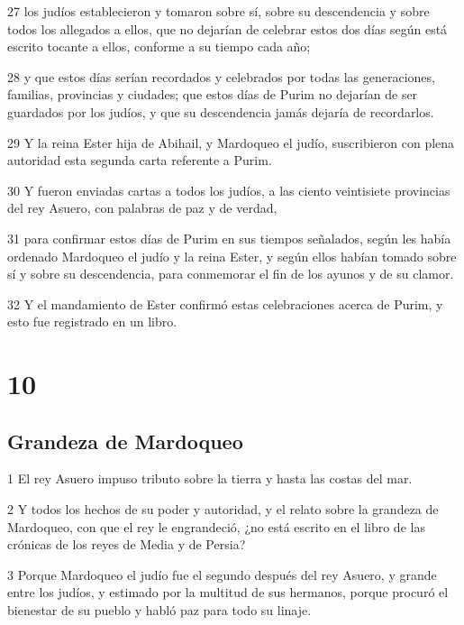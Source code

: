 \par 27 los judíos establecieron y tomaron sobre sí, sobre su descendencia y sobre todos los allegados a ellos, que no dejarían de celebrar estos dos días según está escrito tocante a ellos, conforme a su tiempo cada año;
\par 28 y que estos días serían recordados y celebrados por todas las generaciones, familias, provincias y ciudades; que estos días de Purim no dejarían de ser guardados por los judíos, y que su descendencia jamás dejaría de recordarlos.
\par 29 Y la reina Ester hija de Abihail, y Mardoqueo el judío, suscribieron con plena autoridad esta segunda carta referente a Purim.
\par 30 Y fueron enviadas cartas a todos los judíos, a las ciento veintisiete provincias del rey Asuero, con palabras de paz y de verdad,
\par 31 para confirmar estos días de Purim en sus tiempos señalados, según les había ordenado Mardoqueo el judío y la reina Ester, y según ellos habían tomado sobre sí y sobre su descendencia, para conmemorar el fin de los ayunos y de su clamor.
\par 32 Y el mandamiento de Ester confirmó estas celebraciones acerca de Purim, y esto fue registrado en un libro.

\chapter{10}

\section*{Grandeza de Mardoqueo}

\par 1 El rey Asuero impuso tributo sobre la tierra y hasta las costas del mar.
\par 2 Y todos los hechos de su poder y autoridad, y el relato sobre la grandeza de Mardoqueo, con que el rey le engrandeció, ¿no está escrito en el libro de las crónicas de los reyes de Media y de Persia?
\par 3 Porque Mardoqueo el judío fue el segundo después del rey Asuero, y grande entre los judíos, y estimado por la multitud de sus hermanos, porque procuró el bienestar de su pueblo y habló paz para todo su linaje.

